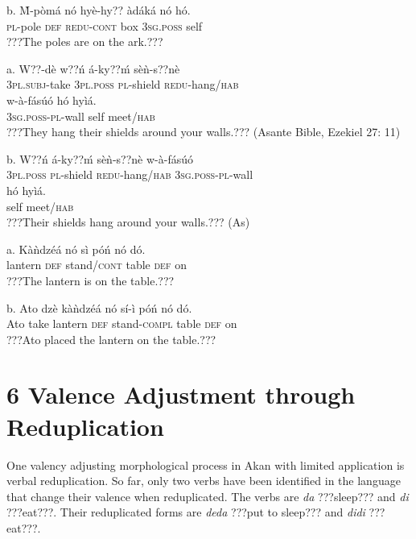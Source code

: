 \documentclass[output=paper]{langsci/langscibook}
\begin{document}
\ea
\gll  b.  \`{M}-pòmá   nó   hyè-hy??   àdáká  nó    hó.\\
       \textsc{pl}{}-pole    \textsc{def}  \textsc{redu-cont}  box  \textsc{3sg.poss}  self  \\
\glt   ???The poles are on the ark.???
\z

\ea
\gll a.   W??-dè    w??ń    á-ky??ḿ   sèǹ-s??nè \\
       \textsc{3pl.subj}{}-take  \textsc{3pl.poss}  \textsc{pl}{}-shield  \textsc{redu}{}-hang/\textsc{hab}\\
\gll   w-à-fásúó    hó   hyìá.    \\
       \textsc{3sg.poss-pl}{}-wall  self  meet/\textsc{hab}  \\
\glt ???They hang their shields around your walls.??? (Asante Bible, Ezekiel 27: 11)
\z

\ea
\gll  b.  W??ń    á-ky??ḿ    sèǹ-s??nè     w-à-fásúó \\
       \textsc{3pl.poss}  \textsc{pl}{}-shield  \textsc{redu}{}-hang/\textsc{hab}  \textsc{3sg.poss-pl}{}-wall\\
\gll   hó  hyìá.\\
       self  meet/\textsc{hab}\\
\glt ???Their shields hang around your walls.??? (As)
\z

\ea
\gll a.  Kàǹdzéá  nó  sì    póń  nó  dó.\\
       lantern    \textsc{def}  stand/\textsc{cont}  table  \textsc{def}  on\\
\glt ???The lantern is on the table.???
\z

\ea
\gll  b.  Ato  dzè  kàǹdzéá  nó  sí-ì    póń  nó  dó.\\
       Ato  take  lantern    \textsc{def}  stand-\textsc{compl}  table  \textsc{def}  on\\
\glt ???Ato placed the lantern on the table.???
\z

\section[6  Valence Adjustment through Reduplication  ]{6  Valence Adjustment through Reduplication  }

One valency adjusting morphological process in Akan with limited application is verbal reduplication. So far, only two verbs have been identified in the language that change their valence when reduplicated. The verbs are \emph{da} ???sleep??? and \emph{di} ???eat???. Their reduplicated forms are \emph{deda} ???put to sleep??? and \emph{didi} ???eat???.
\end{document}
